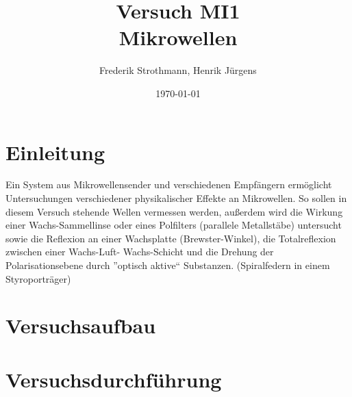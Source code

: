 \documentclass[12pt]{scrartcl}
\title{Versuch MI1\\ Mikrowellen}
\author{Frederik Strothmann, Henrik Jürgens}
\date{\today}
\begin{document}

\maketitle
\tableofcontents
\newpage


\section{Einleitung}

Ein System aus Mikrowellensender und verschiedenen Empfängern ermöglicht Untersuchungen verschiedener physikalischer Effekte an Mikrowellen. So sollen in diesem Versuch stehende Wellen vermessen werden, außerdem wird die Wirkung einer Wachs-Sammellinse oder eines Polfilters (parallele Metallstäbe) untersucht sowie die Reflexion
an einer Wachsplatte (Brewster-Winkel), die Totalreflexion zwischen einer Wachs-Luft-
Wachs-Schicht und die Drehung der Polarisationsebene durch
”optisch aktive“ Substanzen.
(Spiralfedern in einem Styroporträger)

\section{Versuchsaufbau}

\section{Versuchsdurchführung}
\end{document}
